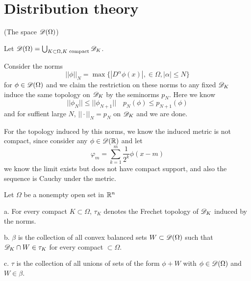\chapter{Distribution theory}

\begin{definition}
    (The space $\mathscr{D}(\Omega)$)\par
    Let $\mathscr{D}(\Omega) = \bigcup_{K\subset \Omega, K\text{ compact}}\mathscr{D}_K$.\par
\end{definition}
Consider the norms
\[||\phi||_N = \max\{|D^{\alpha}\phi(x)|, \in \Omega,|\alpha| \leq N\}\]
for $\phi \in \mathscr{D}(\Omega)$ and we claim the restriction on these norms to any fixed $\mathscr{D}_K$ induce the same topology on $\mathscr{D}_K$ by the seminorms $p_N$. Here we know
\[
||\phi_N|| \leq ||\phi_{N+1}||\quad p_N(\phi) \leq p_{N+1}(\phi)
\]
and for suffient large $N$, $||\cdot||_N = p_N$ on $\mathscr{D}_K$ and we are done.\par
For the topology induced by this norms, we know the induced metric is not compact, since consider any $\phi \in \mathscr{D}(\mathbb{R})$ and let
\[
\varphi_m = \sum_{k=1}^m \dfrac{1}{2^k}\phi(x-m)
\]
we know the limit exists but does not have compact support, and also the sequence is Cauchy under the metric.

\begin{definition}
    Let $\Omega$ be a nonempty open set in $\mathbb{R}^n$\par
    a. For every compact $K\subset \Omega$, $\tau_K$ denotes the Frechet topology of $\mathscr{D}_K$ induced by the norms.\par
    b. $\beta$ is the collection of all convex balanced sets $W\subset\mathscr{D}(\Omega)$ such that $\mathscr{D}_K\cap W \in \tau_K$ for every compact  $\subset \Omega$.\par
    c. $\tau$ is the collection of all unions of sets of the form $\phi+W$ with $\phi \in \mathscr{D}(\Omega)$ and $W\in \beta$. 
\end{definition}

